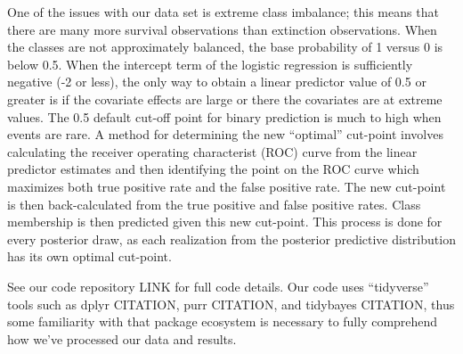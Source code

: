 \documentclass[12pt,letterpaper]{article}
\begin{document}
One of the issues with our data set is extreme class imbalance; this means that there are many more survival observations than extinction observations. When the classes are not approximately balanced, the base probability of 1 versus 0 is below 0.5. When the intercept term of the logistic regression is sufficiently negative (-2 or less), the only way to obtain a linear predictor value of 0.5 or greater is if the covariate effects are large or there the covariates are at extreme values. The 0.5 default cut-off point for binary prediction is much to high when events are rare. A method for determining the new ``optimal'' cut-point involves calculating the receiver operating characterist (ROC) curve from the linear predictor estimates and then identifying the point on the ROC curve which maximizes both true positive rate and the false positive rate. The new cut-point is then back-calculated from the true positive and false positive rates. Class membership is then predicted given this new cut-point. This process is done for every posterior draw, as each realization from the posterior predictive distribution has its own optimal cut-point.

See our code repository LINK for full code details. Our code uses ``tidyverse'' tools such as dplyr CITATION, purr CITATION, and tidybayes CITATION, thus some familiarity with that package ecosystem is necessary to fully comprehend how we've processed our data and results.
\end{document}
